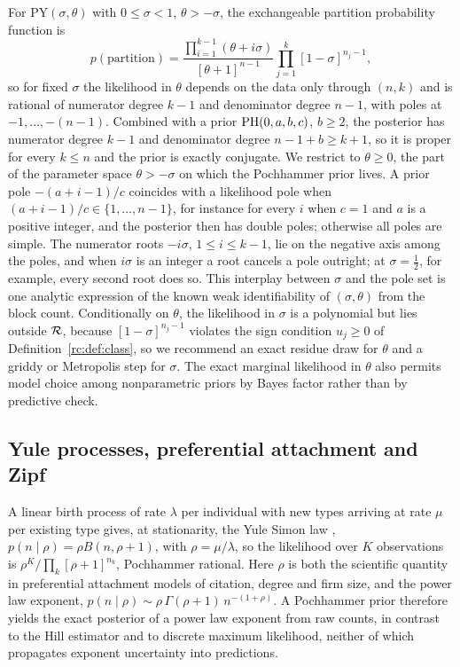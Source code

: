 For $\mathrm{PY}(\sigma,\theta)$ with $0\le\sigma<1$, $\theta>-\sigma$, the exchangeable partition probability function is \citep{rc:pitman2006}
\[
p(\text{partition})=\frac{\prod_{i=1}^{k-1}(\theta+i\sigma)}{[\theta+1]^{n-1}}\prod_{j=1}^k[1-\sigma]^{n_j-1},
\]
so for fixed $\sigma$ the likelihood in $\theta$ depends on the data only through $(n,k)$ and is rational of numerator degree $k-1$ and denominator degree $n-1$, with poles at $-1,\dots,-(n-1)$. Combined with a prior $\mathrm{PH}(0,a,b,c)$, $b\ge2$, the posterior has numerator degree $k-1$ and denominator degree $n-1+b\ge k+1$, so it is proper for every $k\le n$ and the prior is exactly conjugate. We restrict to $\theta\ge0$, the part of the parameter space $\theta>-\sigma$ on which the Pochhammer prior lives. A prior pole $-(a+i-1)/c$ coincides with a likelihood pole when $(a+i-1)/c\in\{1,\dots,n-1\}$, for instance for every $i$ when $c=1$ and $a$ is a positive integer, and the posterior then has double poles; otherwise all poles are simple. The numerator roots $-i\sigma$, $1\le i\le k-1$, lie on the negative axis among the poles, and when $i\sigma$ is an integer a root cancels a pole outright; at $\sigma=\frac12$, for example, every second root does so. This interplay between $\sigma$ and the pole set is one analytic expression of the known weak identifiability of $(\sigma,\theta)$ from the block count. Conditionally on $\theta$, the likelihood in $\sigma$ is a polynomial but lies outside $\mathcal{R}$, because $[1-\sigma]^{n_j-1}$ violates the sign condition $u_j\ge0$ of Definition~\ref{rc:def:class}, so we recommend an exact residue draw for $\theta$ and a griddy or Metropolis step for $\sigma$. The exact marginal likelihood in $\theta$ also permits model choice among nonparametric priors by Bayes factor rather than by predictive check.

\subsection{Yule processes, preferential attachment and Zipf}\label{rc:sec:yule}

A linear birth process of rate $\lambda$ per individual with new types arriving at rate $\mu$ per existing type gives, at stationarity, the Yule Simon law \citep{rc:simon1955}, $p(n\mid\rho)=\rho B(n,\rho+1)$, with $\rho=\mu/\lambda$, so the likelihood over $K$ observations is $\rho^K/\prod_k[\rho+1]^{n_k}$, Pochhammer rational. Here $\rho$ is both the scientific quantity in preferential attachment models of citation, degree and firm size, and the power law exponent, $p(n\mid\rho)\sim\rho\,\Gamma(\rho+1)\,n^{-(1+\rho)}$. A Pochhammer prior therefore yields the exact posterior of a power law exponent from raw counts, in contrast to the Hill estimator and to discrete maximum likelihood, neither of which propagates exponent uncertainty into predictions.

